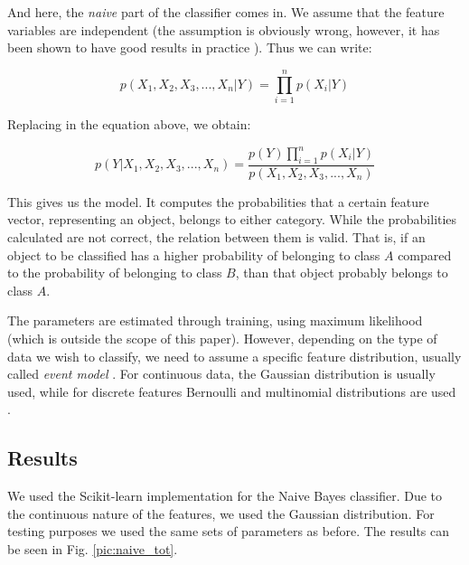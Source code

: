 And here, the \textit{naive} part of the classifier comes in. We assume that the feature variables are independent (the assumption is obviously wrong, however, it has been shown to have good results in practice \cite{rish2001empirical}). Thus we can write:

\begin{equation*}
p(X_1,X_2,X_3,..., X_n\vert Y) = \prod_{i=1}^np(X_i \vert Y)
\end{equation*}

Replacing in the equation above, we obtain:

\begin{equation*}
p(Y\vert X_1,X_2,X_3,..., X_n) = \frac{p(Y)\prod \limits_{i=1}^np(X_i \vert Y)}{p(X_1,X_2,X_3,..., X_n)}
\end{equation*}

This gives us the model. It computes the probabilities that a certain feature vector, representing an object, belongs to either category. While the probabilities calculated are not correct, the relation between them is valid. That is, if an object to be classified has a higher probability of belonging to class $A$ compared to the probability of belonging to class $B$, than that object probably belongs to class $A$. 

The parameters are estimated through training, using maximum likelihood \cite{zhang2004optimality} (which is outside the scope of this paper). However, depending on the type of data we wish to classify, we need to assume a specific feature distribution, usually called \textit{event model} \cite{mccallum1998comparison}. For continuous data, the Gaussian distribution is usually used, while for discrete features Bernoulli and multinomial distributions are used \cite{mccallum1998comparison}.

\subsection{Results}

We used the Scikit-learn \cite{scikit-learn} implementation for the Naive Bayes classifier. Due to the continuous nature of the features, we used the Gaussian distribution. For testing purposes we used the same sets of parameters as before. The results can be seen in Fig. \ref{pic:naive_tot}.

